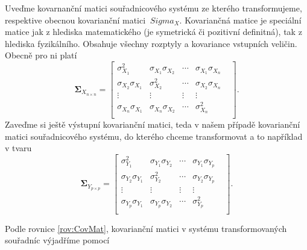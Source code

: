 Uveďme kovarnanční matici souřadnicového systému ze kterého transformujeme, respektive obecnou kovarianční matici $ \ Sigma_ {X} $. Kovariančná matice je speciální matice jak z hlediska matematického (je symetrická či pozitivní definitná), tak z hlediska fyzikálního. Obsahuje všechny rozptyly a kovariance vstupních veličin. Obecně pro ni platí
\begin{equation}
\mathbf{\Sigma}_{X_{n\times n}} = 
\begin{bmatrix}
\sigma_{X_{1}}^{2} & \sigma_{X_{1}}\sigma_{X_{2}} & \cdots & \sigma_{X_{1}}\sigma_{X_{n}}\\
\sigma_{X_{2}}\sigma_{X_{1}} & \sigma_{X_{2}}^{2} &  \cdots & \sigma_{X_{2}}\sigma_{X_{n}}\\
\vdots & \vdots & \vdots & \vdots \\
\sigma_{X_{n}}\sigma_{X_{1}} & \sigma_{X_{n}}\sigma_{X_{2}} & \cdots & \sigma_{X_{n}}^{2} & \\
\end{bmatrix}.
\end{equation}
Zaveďme si ještě výstupní kovarianční matici, teda v našem případě kovarianční matici souřadnicového systému, do kterého chceme transformovat a to například v tvaru
\begin{equation}
\mathbf{\Sigma}_{Y_{p\times p}} = 
\begin{bmatrix}
\sigma_{Y_{1}}^{2} & \sigma_{Y_{1}}\sigma_{Y_{2}} & \cdots & \sigma_{Y_{1}}\sigma_{Y_{p}}\\
\sigma_{Y_{2}}\sigma_{Y_{1}} & \sigma_{Y_{2}}^{2} &  \cdots & \sigma_{Y_{2}}\sigma_{Y_{p}}\\
\vdots & \vdots & \vdots & \vdots \\
\sigma_{Y_{p}}\sigma_{Y_{1}} & \sigma_{Y_{p}}\sigma_{Y_{2}} & \cdots & \sigma_{Y_{p}}^{2} & \\
\end{bmatrix}.
\end{equation}

Podle rovnice \ref{rov:CovMat}, kovarianční matici v systému transformovaných souřadníc výjadříme pomocí

